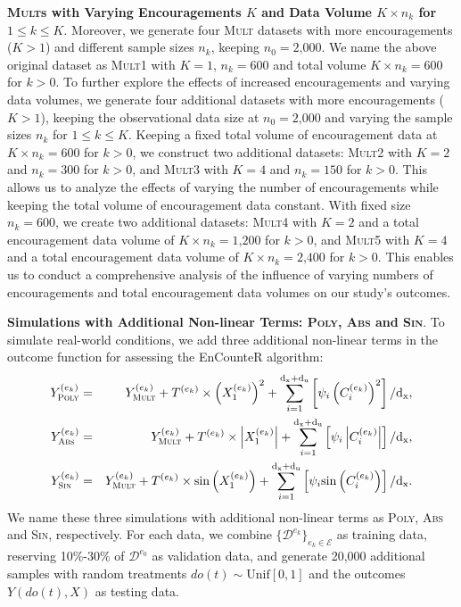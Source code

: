 \documentclass[journal]{IEEEtran}
\begin{document}
\textbf{\textsc{Mult}s with Varying Encouragements $K$ and Data Volume $K \times n_k$ for $1 \leq k \leq K$}. Moreover, we generate four \textsc{Mult} datasets with more encouragements ($K>1$) and different sample sizes $n_k$, keeping $n_0=\text{2,000}$. We name the above original dataset as \textsc{Mult1} with $K=1$, $n_k=600$ and total volume $K \times n_k = 600$ for $k>0$. To further explore the effects of increased encouragements and varying data volumes, we generate four additional datasets with more encouragements ($K>1$), keeping the observational data size at $n_0=\text{2,000}$ and varying the sample sizes $n_k$ for $1 \leq k \leq K$. Keeping a fixed total volume of encouragement data at $K \times n_k = 600$ for $k>0$, we construct two additional datasets: \textsc{Mult2} with $K=2$ and $n_k=300$ for $k>0$, and \textsc{Mult3} with $K=4$ and $n_k=150$ for $k>0$. This allows us to analyze the effects of varying the number of encouragements while keeping the total volume of encouragement data constant.
With fixed size $n_k=600$, we create two additional datasets: \textsc{Mult4} with $K=2$ and a total encouragement data volume of $K \times n_k=\text{1,200}$ for $k>0$, and \textsc{Mult5} with $K=4$ and a total encouragement data volume of $K \times n_k=\text{2,400}$ for $k>0$.
This enables us to conduct a comprehensive analysis of the influence of varying numbers of encouragements and total encouragement data volumes on our study's outcomes.

\textbf{Simulations with Additional Non-linear Terms: \textsc{Poly}, \textsc{Abs} and \textsc{Sin}}. 
To simulate real-world conditions, we add three additional non-linear terms in the outcome function for assessing the EnCounteR algorithm:
{\small
\begin{eqnarray}
Y^{(e_k)}_{\textsc{Poly}} &=& Y^{(e_k)}_{\textsc{Mult}} + T^{(e_k)} \times \left(X_1^{(e_k)}\right)^2 + \sum_{i=1}^{\text{d}_\text{x}+\text{d}_\text{u}} \left[\psi_i\left(C_i^{(e_k)}\right)^2\right]  / \text{d}_\text{x}, 
\nonumber \\
Y^{(e_k)}_{\textsc{Abs}} &=& Y^{(e_k)}_{\textsc{Mult}} + T^{(e_k)} \times \left|X_1^{(e_k)}\right| + \sum_{i=1}^{\text{d}_\text{x}+\text{d}_\text{u}} \left[\psi_i\left|C_i^{(e_k)}\right|\right] / \text{d}_\text{x},
\nonumber
\\
Y^{(e_k)}_{\textsc{Sin}} &=& Y^{(e_k)}_{\textsc{Mult}} + T^{(e_k)} \times \text{sin}\left(X_1^{(e_k)}\right) + \sum_{i=1}^{\text{d}_\text{x}+\text{d}_\text{u}} \left[\psi_i\text{sin}\left(C_i^{(e_k)}\right)\right] / \text{d}_\text{x}. 
\nonumber
\end{eqnarray}
}
We name these three simulations with additional non-linear terms as \textsc{Poly}, \textsc{Abs} and \textsc{Sin}, respectively. For each data, we combine $\{\mathcal{D}^{e_k}\}_{e_k \in \mathcal{E}}$ as training data, reserving 10\%-30\% of $\mathcal{D}^{e_0}$ as validation data, and generate 20,000 additional samples with random treatments $do(t) \sim \text{Unif}[0, 1]$ and the outcomes $Y(do(t),X)$ as testing data. 
\end{document}
